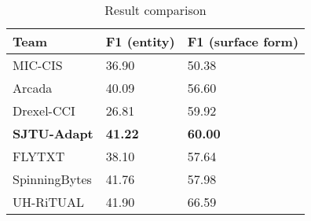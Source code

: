 \begin{table}[th]
	\centering
	\caption{Result comparison}
	\label{tbl:compare}
	\begin{tabular}{|l|l|l|}
		\hline
		Team                & F1 (entity)    & F1 (surface form) \\ \hline
		MIC-CIS             & 36.90          & 50.38             \\ \hline
		Arcada              & 40.09          & 56.60             \\ \hline
		Drexel-CCI          & 26.81          & 59.92             \\ \hline
		\textbf{SJTU-Adapt} & \textbf{41.22} & \textbf{60.00}    \\ \hline
		FLYTXT              & 38.10          & 57.64             \\ \hline
		SpinningBytes       & 41.76          & 57.98             \\ \hline
		UH-RiTUAL           & 41.90          & 66.59             \\ \hline
	\end{tabular}
\end{table}

